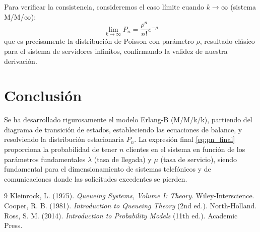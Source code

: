 \documentclass[12pt,a4paper]{article}
\theoremstyle{definition}
\begin{document}
Para verificar la consistencia, consideremos el caso límite cuando $k \to \infty$ (sistema M/M/$\infty$):
\begin{equation}
    \lim_{k \to \infty} P_n = \frac{\rho^n}{n!} e^{-\rho}
\end{equation}
que es precisamente la distribución de Poisson con parámetro $\rho$, resultado clásico para el sistema de servidores infinitos, confirmando la validez de nuestra derivación.

\section{Conclusión}

Se ha desarrollado rigurosamente el modelo Erlang-B (M/M/k/k), partiendo del diagrama de transición de estados, estableciendo las ecuaciones de balance, y resolviendo la distribución estacionaria $P_n$. La expresión final \eqref{eq:pn_final} proporciona la probabilidad de tener $n$ clientes en el sistema en función de los parámetros fundamentales $\lambda$ (tasa de llegada) y $\mu$ (tasa de servicio), siendo fundamental para el dimensionamiento de sistemas telefónicos y de comunicaciones donde las solicitudes excedentes se pierden.

\begin{thebibliography}{9}
     Kleinrock, L. (1975). \textit{Queueing Systems, Volume I: Theory}. Wiley-Interscience.
     Cooper, R. B. (1981). \textit{Introduction to Queueing Theory} (2nd ed.). North-Holland.
     Ross, S. M. (2014). \textit{Introduction to Probability Models} (11th ed.). Academic Press.
\end{thebibliography}
\end{document}
